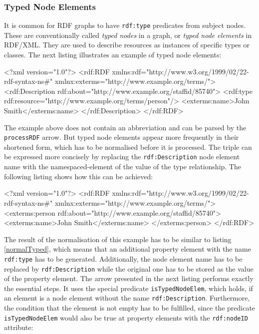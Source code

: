 \documentclass[11pt,a4paper,headsepline, bibtotoc]{scrreprt}
\begin{document}
\subsubsection{Typed Node Elements}
It is common for RDF graphs to have \texttt{rdf:type} predicates from subject nodes. These are conventionally called \textit{typed nodes} in a graph, or \textit{typed node elements} in RDF/XML. They are used to describe resources as instances of specific types or classes. The next listing illustrates an example of typed node elements:
\begin{xmlnb}[caption={Typed Node Element},label=normalTyped]
<?xml version="1.0"?>
<rdf:RDF xmlns:rdf="http://www.w3.org/1999/02/22-rdf-syntax-ns#"
         xmlnx:exterms="http://www.example.org/terms/">
  <rdf:Description rdf:about="http://www.example.org/staffid/85740">
    <rdf:type rdf:resource="http://www.example.org/terms/person"/>
    <exterms:name>John Smith</exterms:name>
  </rdf:Description>
</rdf:RDF>
\end{xmlnb}
The example above does not contain an abbreviation and can be parsed by the \texttt{processRDF} arrow. But typed node elements appear more frequently in their shortened form, which has to be normalised before it is processed. The triple can be expressed more concisely by replacing the \texttt{rdf:Description} node element name with the namespaced-element of the value of the type relationship. The following listing shows how this can be achieved:
\begin{xmlnb}[caption={Concise Typed Node Element}]
<?xml version="1.0"?>
<rdf:RDF xmlns:rdf="http://www.w3.org/1999/02/22-rdf-syntax-ns#"
         xmlnx:exterms="http://www.example.org/terms/">
  <exterms:person rdf:about="http://www.example.org/staffid/85740">
    <exterms:name>John Smith</exterms:name>
  </exterms:person>
</rdf:RDF>
\end{xmlnb}
The result of the normalisation of this example has to be similar to listing \ref{normalTyped}, which means that an additional property element with the name \texttt{rdf:type} has to be generated. Additionally, the node element name has to be replaced by \texttt{rdf:Description} while the original one has to be stored as the value of the property element. The arrow presented in the next listing performs exactly the essential steps. It uses the special predicate \texttt{isTypedNodeElem}, which holds, if an element is a node element without the name \texttt{rdf:Description}. Furthermore, the condition that the element is not empty has to be fulfilled, since the predicate \texttt{isTypedNodeElem} would also be true at property elements with the \texttt{rdf:nodeID} attribute: 
\end{document}
